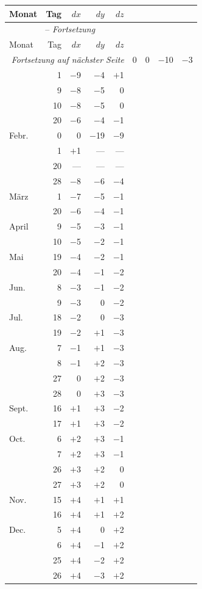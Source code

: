 \documentclass[10pt,a4paper]{article}
\begin{document}
\begin{center}
\small
\begin{longtable}{@{}l@{\hspace{1em}}r@{\hspace{1.5em}}r@{\hspace{1.5em}}r@{\hspace{1.5em}}r@{}}
\toprule
Monat & Tag & $dx$ & $dy$ & $dz$ \\
\midrule
\endfirsthead
\multicolumn{5}{c}{\tablename\ \thetable{} -- \textit{Fortsetzung}}\\
\toprule
Monat & Tag & $dx$ & $dy$ & $dz$ \\
\midrule
\endhead
\midrule
\multicolumn{5}{r}{\textit{Fortsetzung auf nächster Seite}}
\endfoot
\bottomrule
\endlastfoot
Jan. & 0 & 0 & $-$10 & $-$3 \\
& 1 & $-$9 & $-$4 & $+$1 \\
& 9 & $-$8 & $-$5 & 0 \\
& 10 & $-$8 & $-$5 & 0 \\
& 20 & $-$6 & $-$4 & $-$1 \\
Febr. & 0 & 0 & $-$19 & $-$9 \\
& 1 & $+$1 & --- & --- \\
& 20 & --- & --- & --- \\
& 28 & $-$8 & $-$6 & $-$4 \\
März & 1 & $-$7 & $-$5 & $-$1 \\
& 20 & $-$6 & $-$4 & $-$1 \\
April & 9 & $-$5 & $-$3 & $-$1 \\
& 10 & $-$5 & $-$2 & $-$1 \\
Mai & 19 & $-$4 & $-$2 & $-$1 \\
& 20 & $-$4 & $-$1 & $-$2 \\
Jun. & 8 & $-$3 & $-$1 & $-$2 \\
& 9 & $-$3 & 0 & $-$2 \\
Jul. & 18 & $-$2 & 0 & $-$3 \\
& 19 & $-$2 & $+$1 & $-$3 \\
Aug. & 7 & $-$1 & $+$1 & $-$3 \\
& 8 & $-$1 & $+$2 & $-$3 \\
& 27 & 0 & $+$2 & $-$3 \\
& 28 & 0 & $+$3 & $-$3 \\
Sept. & 16 & $+$1 & $+$3 & $-$2 \\
& 17 & $+$1 & $+$3 & $-$2 \\
Oct. & 6 & $+$2 & $+$3 & $-$1 \\
& 7 & $+$2 & $+$3 & $-$1 \\
& 26 & $+$3 & $+$2 & 0 \\
& 27 & $+$3 & $+$2 & 0 \\
Nov. & 15 & $+$4 & $+$1 & $+$1 \\
& 16 & $+$4 & $+$1 & $+$2 \\
Dec. & 5 & $+$4 & 0 & $+$2 \\
& 6 & $+$4 & $-$1 & $+$2 \\
& 25 & $+$4 & $-$2 & $+$2 \\
& 26 & $+$4 & $-$3 & $+$2 \\
\end{longtable}
\end{center}
\end{document}
